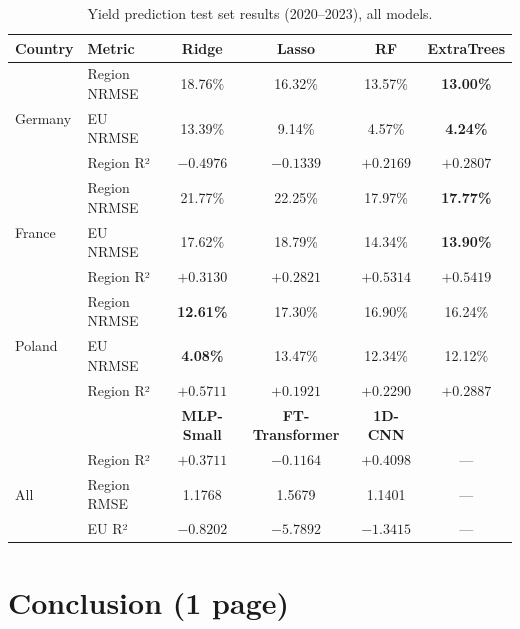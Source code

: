 \documentclass[pdflatex,sn-mathphys-num, oneside]{sn-jnl}%
\theoremstyle{thmstyleone}%
\theoremstyle{thmstyletwo}%
\theoremstyle{thmstylethree}%
\begin{document}
\begin{table}[h]
\centering
\caption{Yield prediction test set results (2020--2023), all models.}
\label{tab:yield_comparison}
\begin{tabular}{llcccc}
\toprule
\textbf{Country} & \textbf{Metric} & \textbf{Ridge} & \textbf{Lasso}
  & \textbf{RF} & \textbf{ExtraTrees} \\
\midrule
\multirow{3}{*}{Germany}
  & Region NRMSE  & 18.76\%   & 16.32\%          & 13.57\%          & \textbf{13.00\%} \\
  & EU NRMSE      & 13.39\%   &  9.14\%          &  4.57\%          & \textbf{4.24\%}  \\
  & Region R²     & $-0.4976$ & $-0.1339$        & $+0.2169$        & \textbf{$+0.2807$} \\
\midrule
\multirow{3}{*}{France}
  & Region NRMSE  & 21.77\%   & 22.25\%          & 17.97\%          & \textbf{17.77\%} \\
  & EU NRMSE      & 17.62\%   & 18.79\%          & 14.34\%          & \textbf{13.90\%} \\
  & Region R²     & $+0.3130$ & $+0.2821$        & $+0.5314$        & \textbf{$+0.5419$} \\
\midrule
\multirow{3}{*}{Poland}
  & Region NRMSE  & \textbf{12.61\%} & 17.30\%   & 16.90\%          & 16.24\% \\
  & EU NRMSE      & \textbf{4.08\%}  & 13.47\%   & 12.34\%          & 12.12\% \\
  & Region R²     & \textbf{$+0.5711$} & $+0.1921$ & $+0.2290$      & $+0.2887$ \\

\midrule
 & & \textbf{MLP-Small} & \textbf{FT-Transformer} & \textbf{1D-CNN} & \\
\multirow{3}{*}{All}
  & Region R²          & $+0.3711$ & $-0.1164$ & $+0.4098$ & --- \\
  & Region RMSE        &    1.1768 &    1.5679 &    1.1401 & --- \\
  & EU R²              & $-0.8202$ & $-5.7892$ & $-1.3415$ & --- \\
\bottomrule
\end{tabular}
\end{table}


\clearpage

\section{Conclusion (1 page)}\label{sec3}
\end{document}
